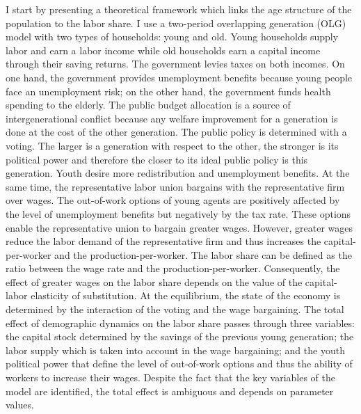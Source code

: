 I start by presenting a theoretical framework which links the age structure of the population to the labor share. I use a two-period overlapping generation (OLG) model with two types of households: young and old. Young households supply labor and earn a labor income while old households earn a capital income through their saving returns.
The government levies taxes on both incomes. On one hand, the government provides unemployment benefits because young people face an unemployment risk; on the other hand, the government funds health spending to the elderly. The public budget allocation is a source of intergenerational conflict because any welfare improvement for a generation is done at the cost of the other generation. The public policy is determined with a voting. The larger is a generation with respect to the other, the stronger is its political power and therefore the closer to its ideal public policy is this generation. Youth desire more redistribution and unemployment benefits.
At the same time, the representative labor union bargains with the representative firm over wages. The out-of-work options of young agents are positively affected by the level of unemployment benefits but negatively by the tax rate. These options enable the representative union to bargain greater wages. However, greater wages reduce the labor demand of the representative firm and thus increases the capital-per-worker and the production-per-worker. The labor share can be defined as the ratio between the wage rate and the production-per-worker. Consequently, the effect of greater wages on the labor share depends on the value of the capital-labor elasticity of substitution.
At the equilibrium, the state of the economy is determined by the interaction of the voting and the wage bargaining. The total effect of demographic dynamics on the labor share passes through three variables: the capital stock determined by the savings of the previous young generation; the labor supply which is taken into account in the wage bargaining; and the youth political power that define the level of out-of-work options and thus the ability of workers to increase their wages. Despite the fact that the key variables of the model are identified, the total effect is ambiguous and depends on parameter values.

